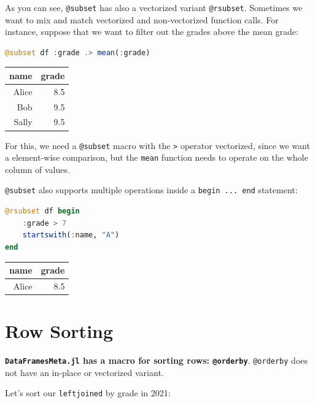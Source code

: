 \documentclass[
  notoc %
]{tufte-book}
\newcommand{\passthrough}[1]{#1}
\begin{document}
As you can see, \passthrough{\lstinline!@subset!} has also a vectorized
variant \passthrough{\lstinline!@rsubset!}. Sometimes we want to mix and
match vectorized and non-vectorized function calls. For instance,
suppose that we want to filter out the grades above the mean grade:

\begin{lstlisting}[language=Julia]
@subset df :grade .> mean(:grade)
\end{lstlisting}

\begin{longtable}[]{@{}rr@{}}
\toprule
name & grade \\
\midrule
\endhead
Alice & 8.5 \\
Bob & 9.5 \\
Sally & 9.5 \\
\bottomrule
\end{longtable}

For this, we need a \passthrough{\lstinline!@subset!} macro with the
\passthrough{\lstinline!>!} operator vectorized, since we want a
element-wise comparison, but the \passthrough{\lstinline!mean!} function
needs to operate on the whole column of values.

\passthrough{\lstinline!@subset!} also supports multiple operations
inside a \passthrough{\lstinline!begin ... end!} statement:

\begin{lstlisting}[language=Julia]
@rsubset df begin
    :grade > 7
    startswith(:name, "A")
end
\end{lstlisting}

\begin{longtable}[]{@{}rr@{}}
\toprule
name & grade \\
\midrule
\endhead
Alice & 8.5 \\
\bottomrule
\end{longtable}

\hypertarget{sec:dataframesmeta_orderby}{%
\section{Row Sorting}\label{sec:dataframesmeta_orderby}}

\textbf{\passthrough{\lstinline!DataFramesMeta.jl!} has a macro for
sorting rows: \passthrough{\lstinline!@orderby!}}.
\passthrough{\lstinline!@orderby!} does not have an in-place or
vectorized variant.

Let's sort our \passthrough{\lstinline!leftjoined!} by grade in 2021:
\end{document}

